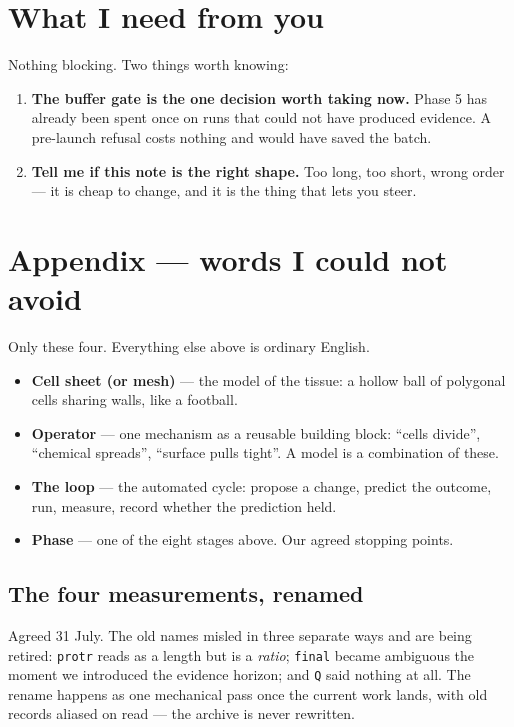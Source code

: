 \documentclass[11pt,a4paper]{article}
\newcommand{\code}[1]{\texttt{#1}}
\begin{document}
\section{What I need from you}

Nothing blocking. Two things worth knowing:

\begin{enumerate}[leftmargin=1.4em]
\item \textbf{The buffer gate is the one decision worth taking now.} Phase 5 has already been
spent once on runs that could not have produced evidence. A pre-launch refusal costs nothing and
would have saved the batch.
\item \textbf{Tell me if this note is the right shape.} Too long, too short, wrong order --- it is
cheap to change, and it is the thing that lets you steer.
\end{enumerate}

\section*{Appendix --- words I could not avoid}

Only these four. Everything else above is ordinary English.

\begin{itemize}
\item \textbf{Cell sheet (or mesh)} --- the model of the tissue: a hollow ball of polygonal cells
sharing walls, like a football.
\item \textbf{Operator} --- one mechanism as a reusable building block: ``cells divide'',
``chemical spreads'', ``surface pulls tight''. A model is a combination of these.
\item \textbf{The loop} --- the automated cycle: propose a change, predict the outcome, run,
measure, record whether the prediction held.
\item \textbf{Phase} --- one of the eight stages above. Our agreed stopping points.
\end{itemize}

\subsection*{The four measurements, renamed}

Agreed 31 July. The old names misled in three separate ways and are being retired: \code{protr}
reads as a length but is a \emph{ratio}; \code{final} became ambiguous the moment we introduced
the evidence horizon; and \code{Q} said nothing at all. The rename happens as one mechanical pass
once the current work lands, with old records aliased on read --- the archive is never rewritten.
\end{document}
